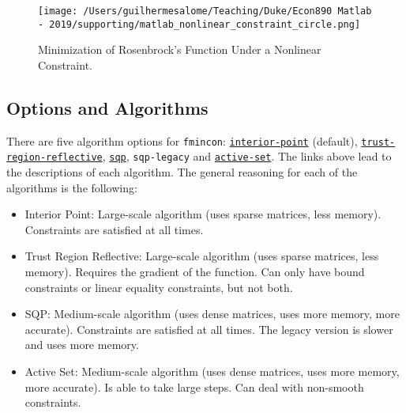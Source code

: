 \documentclass[12pt, a4paper]{article}
\begin{document}
\begin{figure}[H]
\centering
\texttt{[image: /Users/guilhermesalome/Teaching/Duke/Econ890 Matlab - 2019/supporting/matlab\_nonlinear\_constraint\_circle.png]}
\caption{\label{fig:org0871b36}
Minimization of Rosenbrock's Function Under a Nonlinear Constraint.}
\end{figure}
\subsection{Options and Algorithms}
\label{sec:org6a7ecc3}
There are five algorithm options for \texttt{fmincon}: \href{https://www.mathworks.com/help/optim/ug/constrained-nonlinear-optimization-algorithms.html\#brnpd5f}{\texttt{interior-point}} (default), \href{https://www.mathworks.com/help/optim/ug/constrained-nonlinear-optimization-algorithms.html\#brnpeek}{\texttt{trust-region-reflective}}, \href{https://www.mathworks.com/help/optim/ug/constrained-nonlinear-optimization-algorithms.html\#bsgppl4}{\texttt{sqp}}, \texttt{sqp-legacy} and \href{https://www.mathworks.com/help/optim/ug/constrained-nonlinear-optimization-algorithms.html\#brnox01}{\texttt{active-set}}.
The links above lead to the descriptions of each algorithm.
The general reasoning for each of the algorithms is the following:
\begin{itemize}
\item Interior Point: Large-scale algorithm (uses sparse matrices, less memory). Constraints are satisfied at all times.
\item Trust Region Reflective: Large-scale algorithm (uses sparse matrices, less memory). Requires the gradient of the function. Can only have bound constraints or linear equality constraints, but not both.
\item SQP: Medium-scale algorithm (uses dense matrices, uses more memory, more accurate). Constraints are satisfied at all times. The legacy version is slower and uses more memory.
\item Active Set: Medium-scale algorithm (uses dense matrices, uses more memory, more accurate). Is able to take large steps. Can deal with non-smooth constraints.
\end{itemize}
\end{document}
